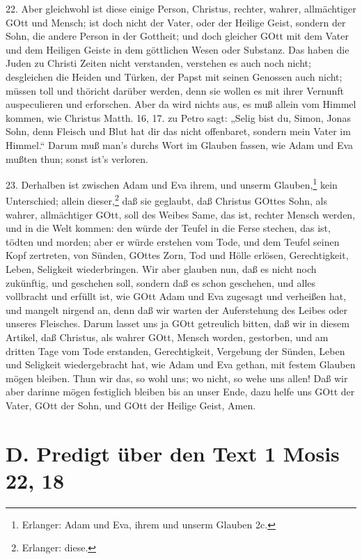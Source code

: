 22. Aber gleichwohl ist diese einige Person, Christus, rechter, wahrer, allmächtiger GOtt und Mensch; ist doch nicht der Vater, oder der Heilige Geist, sondern der Sohn, die andere Person in der Gottheit; und doch gleicher GOtt mit dem Vater und dem Heiligen Geiste in dem göttlichen Wesen oder Substanz. Das haben die Juden zu Christi Zeiten nicht verstanden, verstehen es auch noch nicht; desgleichen die Heiden und Türken, der Papst mit seinen Genossen auch nicht; müssen toll und thöricht darüber werden, denn sie wollen es mit ihrer Vernunft auspeculieren und erforschen. Aber da wird nichts aus, es muß allein vom Himmel kommen, wie Christus Matth. 16, 17. zu Petro sagt: „Selig bist du, Simon, Jonas Sohn, denn Fleisch und Blut hat dir das nicht offenbaret, sondern mein Vater im Himmel.“ Darum muß man’s durchs Wort im Glauben fassen, wie Adam und Eva mußten thun; sonst ist’s verloren.

23. Derhalben ist zwischen Adam und Eva ihrem, und unserm Glauben,\footnote{Erlanger: Adam und Eva, ihrem und unserm Glauben 2c.} kein Unterschied; allein dieser,\footnote{Erlanger: diese.} daß sie geglaubt, daß Christus GOttes Sohn, als wahrer, allmächtiger GOtt, soll des Weibes Same, das ist, rechter Mensch werden, und in die Welt kommen: den würde der Teufel in die Ferse stechen, das ist, tödten und morden; aber er würde erstehen vom Tode, und dem Teufel seinen Kopf zertreten, von Sünden, GOttes Zorn, Tod und Hölle erlösen, Gerechtigkeit, Leben, Seligkeit wiederbringen. Wir aber glauben nun, daß es nicht noch zukünftig, und geschehen soll, sondern daß es schon geschehen, und alles vollbracht und erfüllt ist, wie GOtt Adam und Eva zugesagt und verheißen hat, und mangelt nirgend an, denn daß wir warten der Auferstehung des Leibes oder unseres Fleisches. Darum lasset uns ja GOtt getreulich bitten, daß wir in diesem Artikel, daß Christus, als wahrer GOtt, Mensch worden, gestorben, und am dritten Tage vom Tode erstanden, Gerechtigkeit, Vergebung der Sünden, Leben und Seligkeit wiedergebracht hat, wie Adam und Eva gethan, mit festem Glauben mögen bleiben. Thun wir das, so wohl uns; wo nicht, so wehe uns allen! Daß wir aber darinne mögen festiglich bleiben bis an unser Ende, dazu helfe uns GOtt der Vater, GOtt der Sohn, und GOtt der Heilige Geist, Amen.

\chapter{D. Predigt über den Text 1 Mosis 22, 18}

